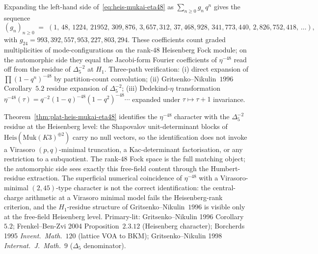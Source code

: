 \begin{remark}
\label{rem:heis-mukai-eta48-coeffs}
Expanding the left-hand side of~\eqref{eq:heis-mukai-eta48} as
$\sum_{n\geq 0} g_n\,q^n$ gives the sequence
\[
 (g_n)_{n\geq 0}
 \;=\;
 (1,\,48,\,1224,\,21952,\,309{,}876,\,
 3{,}657{,}312,\,37{,}468{,}928,\,
 341{,}773{,}440,\,2{,}826{,}752{,}418,\,\ldots),
\]
with $g_{24} = 993{,}392{,}557{,}953{,}227{,}803{,}294$.
These coefficients count graded multiplicities of mode-configurations
on the rank-$48$ Heisenberg Fock module; on the automorphic side they
equal the Jacobi-form Fourier coefficients of $\eta^{-48}$ read off
from the residue of $\Delta_5^{-2}$ at $H_1$. Three-path verification:
(i) direct expansion of $\prod(1-q^n)^{-48}$ by partition-count
convolution; (ii) Gritsenko--Nikulin~$1996$ Corollary~$5.2$ residue
expansion of $\Delta_5^{-2}$; (iii) Dedekind-$\eta$ transformation
$\eta^{-48}(\tau)=q^{-2}(1-q)^{-48}(1-q^2)^{-48}\cdots$ expanded under
$\tau\mapsto\tau+1$ invariance.
\end{remark}

\begin{remark}
\label{rem:heis-mukai-not-virasoro-minimal}
Theorem~\ref{thm:plat-heis-mukai-eta48} identifies the $\eta^{-48}$
character with the $\Delta_5^{-2}$ residue at the Heisenberg level: the
Shapovalov unit-determinant blocks of $\mathrm{Heis}(\mathrm{Muk}(K3)^{\oplus 2})$
carry no null vectors, so the identification does not invoke a
Virasoro $(p,q)$-minimal truncation, a Kac-determinant factorisation,
or any restriction to a subquotient. The rank-$48$ Fock space is the
full matching object; the automorphic side sees exactly this free-field
content through the Humbert-residue extraction. The superficial
numerical coincidence of $\eta^{-48}$ with a Virasoro-minimal
$(2,45)$-type character is not the correct identification: the
central-charge arithmetic at a Virasoro minimal model fails the
Heisenberg-rank criterion, and the $H_1$-residue structure of
Gritsenko--Nikulin~$1996$ is visible only at the free-field Heisenberg
level. Primary-lit: Gritsenko--Nikulin 1996 Corollary~$5.2$;
Frenkel--Ben-Zvi 2004 Proposition~$2.3.12$ (Heisenberg character);
Borcherds 1995 \emph{Invent.\ Math.}~$120$ (lattice VOA to BKM);
Gritsenko--Nikulin 1998 \emph{Internat.\ J.\ Math.}~$9$ ($\Delta_5$
denominator).
\end{remark}

